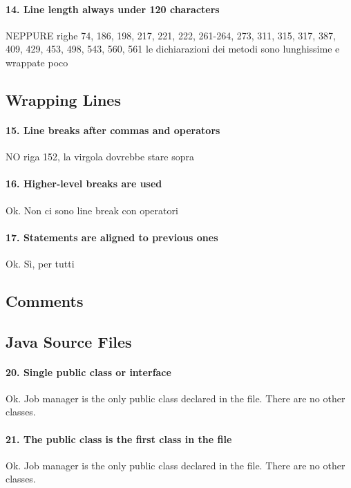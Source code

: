 \documentclass[english]{article}
\begin{document}
\paragraph{14. Line length always under 120 characters}
NEPPURE
righe 74, 186, 198, 217, 221, 222, 261-264, 273, 311, 315, 317, 387, 409, 429, 453, 498, 543, 560, 561
le dichiarazioni dei metodi sono lunghissime e wrappate poco

\subsection{Wrapping Lines}
\paragraph{15. Line breaks after commas and operators}
NO
riga 152, la virgola dovrebbe stare sopra %

\paragraph{16. Higher-level breaks are used}
Ok.
Non ci sono line break con operatori

\paragraph{17. Statements are aligned to previous ones}
Ok.
Sì, per tutti

\subsection{Comments}

\subsection{Java Source Files}
\paragraph{20. Single public class or interface}
Ok.
Job manager is the only public class declared in the file.
There are no other classes.

\paragraph{21. The public class is the first class in the file}
Ok.
Job manager is the only public class declared in the file.
There are no other classes.
\end{document}
